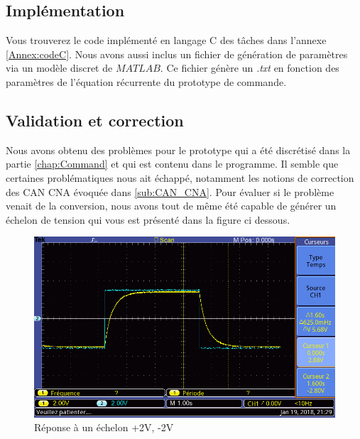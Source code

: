 		\subsection{Implémentation}
		Vous trouverez le code implémenté en langage C des tâches dans l'annexe \ref{Annex:codeC}. Nous avons aussi inclus un fichier de génération de paramètres via un modèle discret de $MATLAB$. Ce fichier génère un \emph{.txt} en fonction des paramètres de l'équation récurrente du prototype de commande.
		\subsection{Validation et correction}
		Nous avons obtenu des problèmes pour le prototype qui a été discrétisé dans la partie \ref{chap:Command} et qui est contenu dans le programme. Il semble que certaines problématiques nous ait échappé, notamment les notions de correction des CAN CNA évoquée dans \ref{sub:CAN_CNA}. Pour évaluer si le problème venait de la conversion, nous avons tout de même été capable de générer un échelon de tension qui vous est présenté dans la figure ci dessous. 
		\begin{figure}[!ht]
		\centering
		\includegraphics[width = .7\textwidth]{./VI/images/MicroC-reponseEchelon.png}
		\caption{Réponse à un échelon +2V, -2V}
\end{figure}				
		